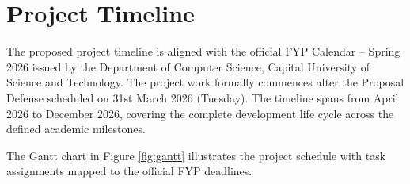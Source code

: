\documentclass[12pt,a4paper]{report}
\begin{document}
\section{Project Timeline}

The proposed project timeline is aligned with the official FYP Calendar -- Spring 2026 issued by the Department of Computer Science, Capital University of Science and Technology. The project work formally commences after the Proposal Defense scheduled on 31st March 2026 (Tuesday). The timeline spans from April 2026 to December 2026, covering the complete development life cycle across the defined academic milestones.

The Gantt chart in Figure \ref{fig:gantt} illustrates the project schedule with task assignments mapped to the official FYP deadlines.

\end{document}
